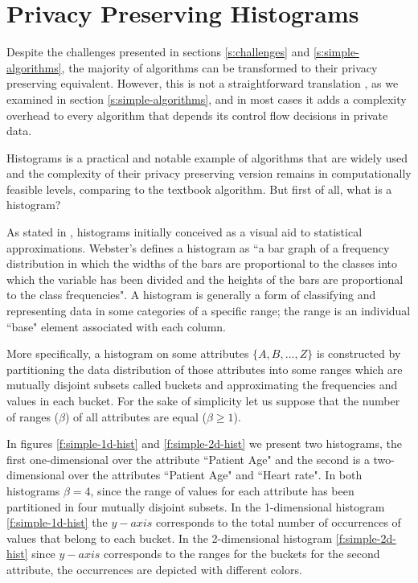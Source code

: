 \section{Privacy Preserving Histograms}\label{s:histograms}
Despite the challenges presented in sections \ref{s:challenges} and \ref{s:simple-algorithms}, the majority of algorithms can be transformed to their privacy preserving equivalent.
However, this is not a straightforward translation , as we examined in section \ref{s:simple-algorithms}, and in most cases it adds a complexity overhead to every algorithm that depends its control flow decisions in private data.

Histograms is a practical and notable example of algorithms that are widely used and the complexity of their privacy preserving version remains in computationally feasible levels, comparing to the textbook algorithm.
But first of all, what is a histogram?

As stated in \cite{ioannidis2003history}, histograms initially conceived as a visual aid to statistical approximations.
Webster’s defines a histogram as ``a bar graph of a frequency distribution in which the widths of the bars are proportional to the classes into which the variable has been divided and the heights of the bars are proportional to the class frequencies".
A histogram is generally a form of classifying and representing data in some categories of a specific range; the range is an individual ``base" element associated with each column.

More specifically, a histogram on some attributes $\{A, B, \dots, Z\}$ is constructed by partitioning the data distribution of those attributes into some ranges which are mutually disjoint subsets called buckets and approximating the frequencies and values in each bucket.
For the sake of simplicity let us suppose that the number of ranges ($\beta$) of all attributes are equal ($\beta \geq 1$).

In figures \ref{f:simple-1d-hist} and \ref{f:simple-2d-hist} we present two histograms, the first one\hyp dimensional over the attribute ``Patient Age" and the second is a two\hyp dimensional over the attributes ``Patient Age" and ``Heart rate".
In both histograms $\beta = 4$, since the range of values for each attribute has been partitioned in four mutually disjoint subsets.
In the 1\hyp dimensional histogram \ref{f:simple-1d-hist} the $y-axis$ corresponds to the total number of occurrences of values that belong to each bucket.
In the 2\hyp dimensional histogram \ref{f:simple-2d-hist} since $y-axis$ corresponds to the ranges for the buckets for the second attribute, the occurrences are depicted with different colors.


